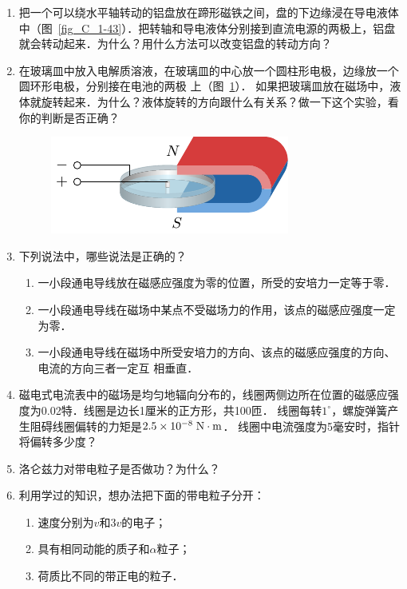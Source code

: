 \begin{enumerate}
    \item 把一个可以绕水平轴转动的铝盘放在蹄形磁铁之间，盘的下边缘浸在导电液体中（图~\ref{fig_C_1-43}）．把转轴和导电液体分别接到直流电源的两极上，铝盘就会转动起来．为什么？用什么方法可以改变铝盘的转动方向？
\item 在玻璃皿中放入电解质溶液，在玻璃皿的中心放一个圆柱形电极，边缘放一个圆环形电极，分别接在电池的两极
上（图~\ref{fig_C_1-44}）．
如果把玻璃皿放在磁场中，液体就旋转起来．为什么？液体旋转的方向跟什么有关系？做一下这个实验，看你的判断是否正确？
\begin{figure}[htbp]
    \centering
    \includegraphics{fig/C/1-44.pdf}
    \caption{}\label{fig_C_1-44}
\end{figure}
\item 下列说法中，哪些说法是正确的？
\begin{enumerate}
    \item 一小段通电导线放在磁感应强度为零的位置，所受的安培力一定等于零．
    \item 一小段通电导线在磁场中某点不受磁场力的作用，该点的磁感应强度一定为零．
    \item 一小段通电导线在磁场中所受安培力的方向、该点的磁感应强度的方向、电流的方向三者一定互
相垂直．
\end{enumerate}

\item 磁电式电流表中的磁场是均匀地辐向分布的，线圈两侧边所在位置的磁感应强度为0.02特．线圈是边长1厘米的正方形，共100匝．
线圈每转$1^{\circ}$，螺旋弹簧产生阻碍线圈偏转的力矩是$2.5\times10^{-8} \;\text{N}\cdot\text{m} $．
线圈中电流强度为5毫安时，指针将偏转多少度？
\item 洛仑兹力对带电粒子是否做功？为什么？    
\item 利用学过的知识，想办法把下面的带电粒子分开：
\begin{enumerate}
    \item 速度分别为$v$和$3v$的电子；
    \item 具有相同动能的质子和$\alpha$粒子；
    \item 荷质比不同的带正电的粒子．
\end{enumerate}





\end{enumerate}
